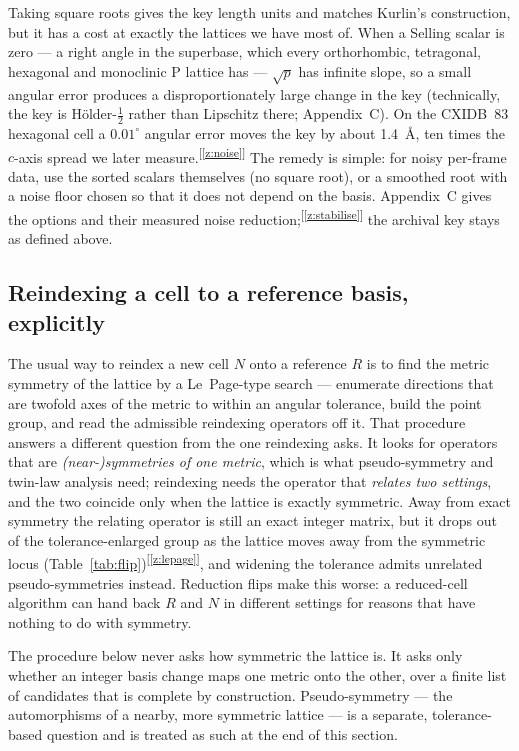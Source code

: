 \documentclass[11pt]{article}
\newcommand{\chk}[1]{\textsuperscript{[\ref{#1}]}}
\begin{document}
Taking square roots gives the key length units and matches Kurlin's construction, but it has a cost at exactly the lattices we have most of. When a Selling scalar is zero --- a right angle in the superbase, which every orthorhombic, tetragonal, hexagonal and monoclinic P lattice has --- $\sqrt{p}$ has infinite slope, so a small angular error produces a disproportionately large change in the key (technically, the key is H\"older-$\tfrac12$ rather than Lipschitz there; Appendix~C). On the CXIDB~83 hexagonal cell a $0.01^\circ$ angular error moves the key by about \SI{1.4}{\angstrom}, ten times the $c$-axis spread we later measure.\chk{z:noise} The remedy is simple: for noisy per-frame data, use the sorted scalars themselves (no square root), or a smoothed root with a noise floor chosen so that it does not depend on the basis. Appendix~C gives the options and their measured noise reduction;\chk{z:stabilise} the archival key stays as defined above.

\subsection{Reindexing a cell to a reference basis, explicitly}
\label{sec:reindex-proc}

The usual way to reindex a new cell $N$ onto a reference $R$ is to find the metric symmetry of the lattice by a Le~Page-type search --- enumerate directions that are twofold axes of the metric to within an angular tolerance, build the point group, and read the admissible reindexing operators off it. That procedure answers a different question from the one reindexing asks. It looks for operators that are \emph{(near-)symmetries of one metric}, which is what pseudo-symmetry and twin-law analysis need; reindexing needs the operator that \emph{relates two settings}, and the two coincide only when the lattice is exactly symmetric. Away from exact symmetry the relating operator is still an exact integer matrix, but it drops out of the tolerance-enlarged group as the lattice moves away from the symmetric locus (Table~\ref{tab:flip})\chk{z:lepage}, and widening the tolerance admits unrelated pseudo-symmetries instead. Reduction flips make this worse: a reduced-cell algorithm can hand back $R$ and $N$ in different settings for reasons that have nothing to do with symmetry.

The procedure below never asks how symmetric the lattice is. It asks only whether an integer basis change maps one metric onto the other, over a finite list of candidates that is complete by construction. Pseudo-symmetry --- the automorphisms of a nearby, more symmetric lattice --- is a separate, tolerance-based question and is treated as such at the end of this section.
\end{document}
